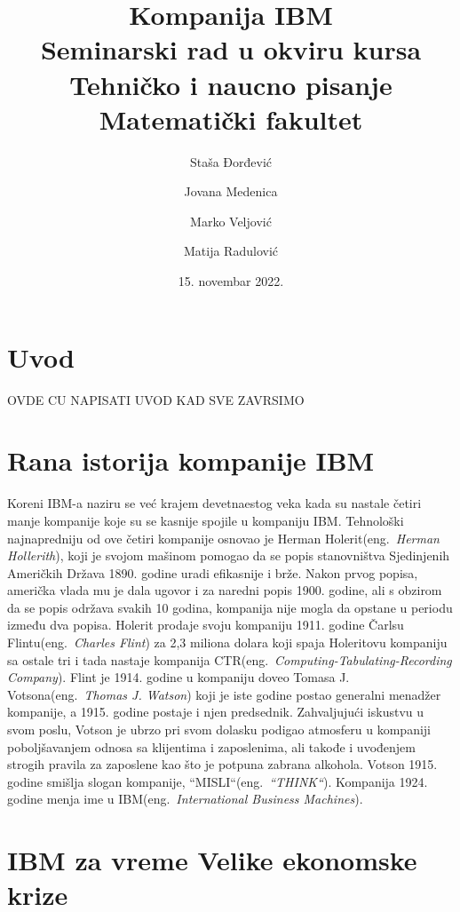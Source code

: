 \documentclass[a4paper]{article}
\title{Kompanija IBM \\
\normalsize Seminarski rad u okviru kursa\\ Tehničko i naucno pisanje
\\Matematički fakultet}
\author{Staša Đorđević \and
Jovana Medenica \and
Marko Veljović \and
Matija Radulović} %
\date{15. novembar 2022.} %
\begin{document}
\maketitle
\tableofcontents
\section{Uvod}
OVDE CU NAPISATI UVOD KAD SVE ZAVRSIMO %

\section{Rana istorija kompanije IBM}
Koreni IBM-a naziru se već krajem devetnaestog veka kada su nastale četiri manje kompanije koje su se kasnije spojile u kompaniju IBM. Tehnološki najnapredniju od ove četiri kompanije osnovao je Herman Holerit(eng.~{\em Herman Hollerith}), koji je svojom mašinom pomogao da se popis stanovništva Sjedinjenih Američkih Država 1890. godine uradi efikasnije i brže. Nakon prvog popisa, američka vlada mu je dala ugovor i za naredni popis 1900. godine, ali s obzirom da se popis održava svakih 10 godina, kompanija nije mogla da opstane u periodu između dva popisa. Holerit prodaje svoju kompaniju 1911. godine Čarlsu Flintu(eng.~{\em Charles Flint}) za 2,3 miliona dolara koji spaja Holeritovu kompaniju sa ostale tri i tada nastaje kompanija CTR(eng.~{\em Computing-Tabulating-Recording Company}). Flint je 1914. godine u kompaniju doveo Tomasa J. Votsona(eng.~{\em Thomas J. Watson}) koji je iste godine postao generalni menadžer kompanije, a 1915. godine postaje i njen predsednik. Zahvaljujući iskustvu u svom poslu, Votson je ubrzo pri svom dolasku podigao atmosferu u kompaniji poboljšavanjem odnosa sa klijentima i zaposlenima, ali takođe i uvođenjem strogih pravila za zaposlene kao što je potpuna zabrana alkohola. Votson 1915. godine smišlja slogan kompanije, ``MISLI``(eng.~{\em ``THINK``}). Kompanija 1924. godine menja ime u IBM(eng.~{\em International Business Machines}).

\section{IBM za vreme Velike ekonomske krize}
\end{document}
